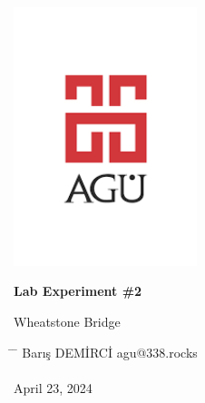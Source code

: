 \begin{center}
	\includegraphics[width=0.4\textwidth]{assets/agu.png}

	\Huge
	\textbf{Lab Experiment \#2}

	\vspace{0.3cm}
	\Huge
	Wheatstone Bridge

	\vspace{0.8cm}
	\large
	\vspace{0.5cm}
	\LARGE
	\vspace{1.5cm}
	\textbf{}
	\vfill
	\vspace{0.8cm}
	\Large
\end{center}

\begin{tabbing}
	\hspace*{1em}\= \hspace*{8em} \= \kill
	\> Barış DEMİRCİ \> agu@338.rocks \\
	\> \> \\
	\> April 23, 2024 \> \\
\end{tabbing}

